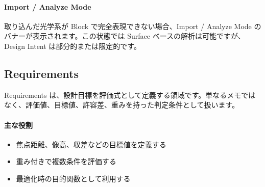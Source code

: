 \documentclass[11pt]{article}
\begin{document}
\paragraph{Import / Analyze Mode}
取り込んだ光学系が Block で完全表現できない場合、Import / Analyze Mode のバナーが表示されます。この状態では Surface ベースの解析は可能ですが、Design Intent は部分的または限定的です。

\subsection{Requirements}
Requirements は、設計目標を評価式として定義する領域です。単なるメモではなく、評価値、目標値、許容差、重みを持った判定条件として扱います。

\paragraph{主な役割}
\begin{itemize}
  \item 焦点距離、像高、収差などの目標値を定義する
  \item 重み付きで複数条件を評価する
  \item 最適化時の目的関数として利用する
\end{itemize}
\end{document}
